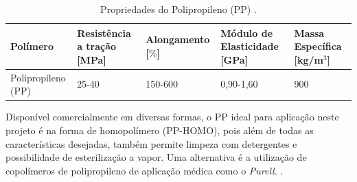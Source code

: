 \begin{table}[ht] 

    \centering 

    \caption{Propriedades do Polipropileno (PP) \cite{materiais}.} 

    \label{tab:PropPP} 

    \begin{adjustbox}{max width = \textwidth} 

        \begin{tabular}{|C{3cm}|C{3cm}|C{2.8cm}|C{3cm}|C{2.5cm}|} 

            \hline 


            \textbf{Polímero} & \textbf{Resistência a tração [MPa]} & \textbf{Alongamento [$\%$]} & \textbf{Módulo  de Elasticidade [GPa]} & \textbf{Massa Específica [kg/m$^3$]} \\ \hline 

             

              Polipropileno (PP) & 25-40 & 150-600 & 0,90-1,60  & 900 

             \\ \hline 

        \end{tabular} 

    \end{adjustbox} 

\end{table} 
Disponível comercialmente em diversas formas, o PP ideal para aplicação neste projeto é na forma de homopolímero (PP-HOMO), pois além de todas as características desejadas, também permite limpeza com detergentes e possibilidade de esterilização a vapor. Uma alternativa é a utilização de copolímeros de polipropileno de aplicação médica como o \textit{Purell}. \cite{HMC_poly}.


